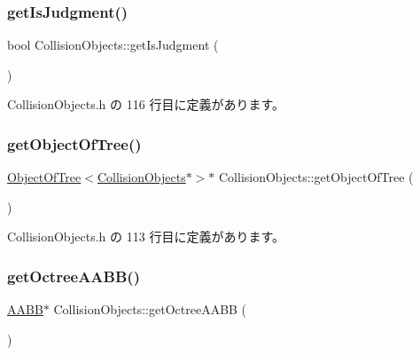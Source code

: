 \subsubsection{\texorpdfstring{get\+Is\+Judgment()}{getIsJudgment()}}
{\footnotesize\ttfamily bool Collision\+Objects\+::get\+Is\+Judgment (\begin{DoxyParamCaption}{ }\end{DoxyParamCaption})\hspace{0.3cm}{\ttfamily [inline]}}



 Collision\+Objects.\+h の 116 行目に定義があります。

\mbox{\label{class_collision_objects_a344311b0c469e591a112eb1d6b0247cb}} 
\subsubsection{\texorpdfstring{get\+Object\+Of\+Tree()}{getObjectOfTree()}}
{\footnotesize\ttfamily \mbox{\hyperlink{class_object_of_tree}{Object\+Of\+Tree}}$<$\mbox{\hyperlink{class_collision_objects}{Collision\+Objects}}$\ast$$>$$\ast$ Collision\+Objects\+::get\+Object\+Of\+Tree (\begin{DoxyParamCaption}{ }\end{DoxyParamCaption})\hspace{0.3cm}{\ttfamily [inline]}}



 Collision\+Objects.\+h の 113 行目に定義があります。

\mbox{\label{class_collision_objects_aee138e1c28f7f3dcbdce56181d59b628}} 
\subsubsection{\texorpdfstring{get\+Octree\+A\+A\+B\+B()}{getOctreeAABB()}}
{\footnotesize\ttfamily \mbox{\hyperlink{class_a_a_b_b}{A\+A\+BB}}$\ast$ Collision\+Objects\+::get\+Octree\+A\+A\+BB (\begin{DoxyParamCaption}{ }\end{DoxyParamCaption})\hspace{0.3cm}{\ttfamily [inline]}}




